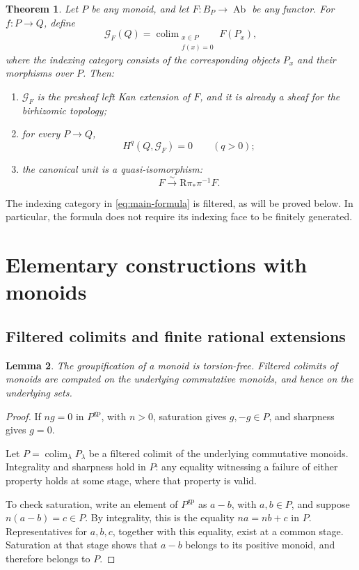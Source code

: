 \documentclass[11pt]{article}
\newtheorem{theorem}{Theorem}[section]
\newtheorem{lemma}[theorem]{Lemma}
\theoremstyle{definition}
\theoremstyle{remark}
\DeclareMathOperator{\colim}{colim}
\DeclareMathOperator{\Ab}{Ab}
\newcommand{\gp}{\mathrm{gp}}
\newcommand{\cG}{\mathcal G}
\begin{document}
\begin{theorem}\label{thm:main}
Let \(P\) be any monoid, and let \(F:B_P\to\Ab\) be any functor.
For \(f:P\to Q\), define
\begin{equation}\label{eq:main-formula}
\cG_F(Q)=
\colim_{\substack{x\in P\\f(x)=0}} F(P_x),
\end{equation}
where the indexing category consists of the corresponding objects
\(P_x\) and their morphisms over \(P\). Then:
\begin{enumerate}[label=\textup{(\roman*)}]
\item \(\cG_F\) is the presheaf left Kan extension of \(F\), and it is
already a sheaf for the birhizomic topology;
\item for every \(P\to Q\),
\[
H^q(Q,\cG_F)=0\qquad(q>0);
\]
\item the canonical unit is a quasi-isomorphism:
\[
F \xrightarrow{\ \sim\ } \mathrm R\pi_*\pi^{-1}F.
\]
\end{enumerate}
\end{theorem}

The indexing category in \eqref{eq:main-formula} is filtered, as will
be proved below. In particular, the formula does not require its
indexing face to be finitely generated.

\section{Elementary constructions with monoids}

\subsection{Filtered colimits and finite rational extensions}

\begin{lemma}\label{lem:filtered}
The groupification of a monoid is torsion-free. Filtered colimits of
monoids are computed on the underlying commutative monoids, and hence
on the underlying sets.
\end{lemma}

\begin{proof}
If \(ng=0\) in \(P^{\gp}\), with \(n>0\), saturation gives
\(g,-g\in P\), and sharpness gives \(g=0\).

Let \(P=\colim_\lambda P_\lambda\) be a filtered colimit of the
underlying commutative monoids. Integrality and sharpness hold in
\(P\): any equality witnessing a failure of either property holds at
some stage, where that property is valid.

To check saturation, write an element of \(P^{\gp}\) as \(a-b\), with
\(a,b\in P\), and suppose \(n(a-b)=c\in P\). By integrality, this is
the equality \(na=nb+c\) in \(P\). Representatives for \(a,b,c\),
together with this equality, exist at a common stage. Saturation at
that stage shows that \(a-b\) belongs to its positive monoid, and
therefore belongs to \(P\).
\end{proof}
\end{document}
